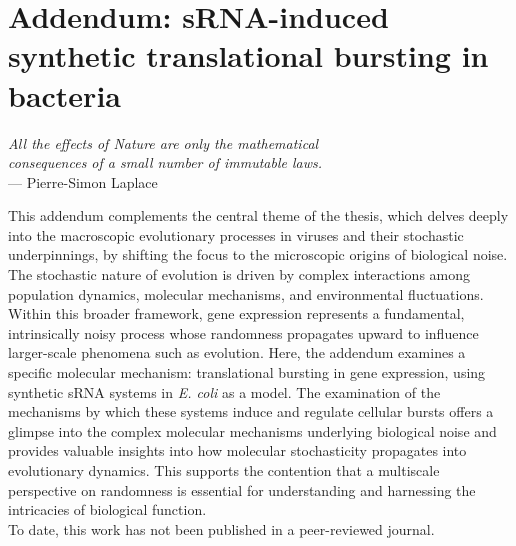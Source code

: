 \chapter*{Addendum: sRNA-induced synthetic translational bursting in bacteria}
{}

\begin{flushright}
    \textit{All the effects of Nature are only the mathematical\\consequences of a small number of immutable laws.}\\
    --- Pierre-Simon Laplace
\end{flushright}

\vspace{1cm}

\noindent This addendum complements the central theme of the thesis, which delves deeply into the macroscopic evolutionary processes in viruses and their stochastic underpinnings, by shifting the focus to the microscopic origins of biological noise. The stochastic nature of evolution is driven by complex interactions among population dynamics, molecular mechanisms, and environmental fluctuations. Within this broader framework, gene expression represents a fundamental, intrinsically noisy process whose randomness propagates upward to influence larger-scale phenomena such as evolution. Here, the addendum examines a specific molecular mechanism: translational bursting in gene expression, using synthetic sRNA systems in \textit{E. coli} as a model. The examination of the mechanisms by which these systems induce and regulate cellular bursts offers a glimpse into the complex molecular mechanisms underlying biological noise and provides valuable insights into how molecular stochasticity propagates into evolutionary dynamics. This supports the contention that a multiscale perspective on randomness is essential for understanding and harnessing the intricacies of biological function.\\

\noindent To date, this work has not been published in a peer-reviewed journal.\\

\vfill


\pagebreak

